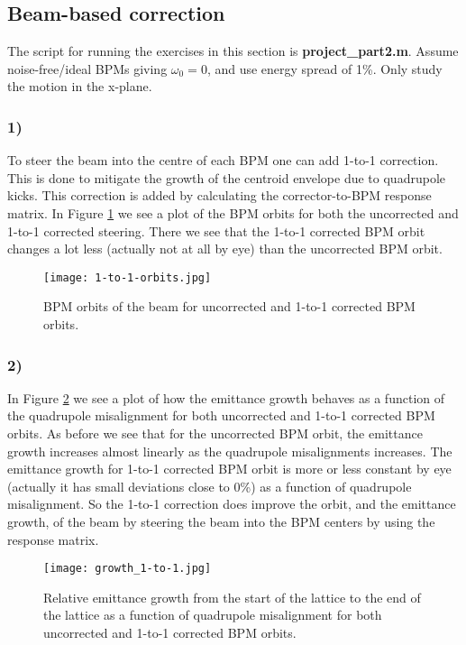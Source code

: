 \documentclass[12pt,a4paper,english]{article}
\begin{document}
\newpage
\subsection*{Beam-based correction}
\label{subsect:Beam correction}
The script for running the exercises in this section is \textbf{project\_part2.m}. Assume noise-free/ideal BPMs giving $\omega_0=0$, and use energy spread of 1\%. Only study the motion in the x-plane.
\subsubsection*{1)}
To steer the beam into the centre of each BPM one can add 1-to-1 correction. This is done to mitigate the growth of the centroid envelope due to quadrupole kicks. This correction is added by calculating the corrector-to-BPM response matrix. In Figure \ref{fig:1-to-1_orbit} we see a plot of the BPM orbits for both the uncorrected and 1-to-1 corrected steering. There we see that the 1-to-1 corrected BPM orbit changes a lot less (actually not at all by eye) than the uncorrected BPM orbit.

\begin{figure}[htbp!]
	\centering\texttt{[image: 1-to-1-orbits.jpg]}
	\caption{BPM orbits of the beam for uncorrected and 1-to-1 corrected BPM orbits. \label{fig:1-to-1_orbit}}
\end{figure} 
\newpage
\subsubsection*{2)}
In Figure \ref{fig:em_growth_1to1} we see a plot of how the emittance growth behaves as a function of the quadrupole misalignment for both uncorrected and 1-to-1 corrected BPM orbits. As before we see that for the uncorrected BPM orbit, the emittance growth increases almost linearly as the quadrupole misalignments increases. The emittance growth for 1-to-1 corrected BPM orbit is more or less constant by eye (actually it has small deviations close to 0\%) as a function of quadrupole misalignment. So the 1-to-1 correction does improve the orbit, and the emittance growth, of the beam by steering the beam into the BPM centers by using the response matrix.

\begin{figure}[htbp!]
	\centering\texttt{[image: growth\_1-to-1.jpg]}
	\caption{Relative emittance growth from the start of the lattice to the end of the lattice as a function of quadrupole misalignment for both uncorrected and 1-to-1 corrected BPM orbits. \label{fig:em_growth_1to1}}
\end{figure} 
\end{document}
